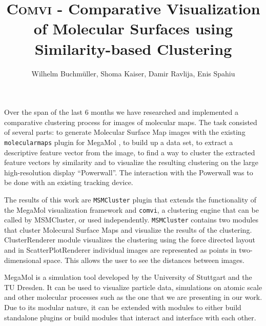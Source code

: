 \documentclass[journal]{vgtc}       %
\title{\textsc{Comvi} - Comparative Visualization of Molecular Surfaces using Similarity-based Clustering}
\author{Wilhelm Buchm\"uller, Shoma Kaiser, Damir Ravlija, Enis Spahiu}
\newcommand{\todo}[1]{\textcolor{red}{\textbf{TODO:} #1}}
\begin{document}

\label{sec:intro}
%
\maketitle
%
Over the span of the last 6 months we  have researched and implemented a comparative clustering  process for images of molecular maps.
The task consisted of several parts: to generate Molecular Surface Map images with the existing \verb|molecularmaps| plugin for MegaMol \cite{MegaMol}, to build up a data set, to extract a descriptive feature vector from the image, to find a way to cluster the extracted  feature vectors by similarity  and to visualize the resulting clustering on the large high-resolution display ``Powerwall''. The interaction with the Powerwall was to be done with  an existing tracking device.

The results of this work are \verb|MSMCluster| plugin that  extends the functionality of the MegaMol visualization framework and \verb|comvi|, a clustering engine that can be called by MSMCluster, or used independently. \verb|MSMCluster| contains two modules that cluster Molecural Surface Maps and visualize the results of the clustering. ClusterRenderer module visualizes the clustering using the force directed layout and in ScatterPlotRenderer individual images are represented as points in two-dimensional space. This allows the user to see the distances between images. 

MegaMol is a simulation tool developed by the University of Stuttgart and the TU Dresden. It can be used to visualize particle data, simulations on atomic scale and other molecular processes such as the one that we are presenting in our work. 
Due to its modular nature, it can be extended with modules to either build standalone plugins or build modules that interact and interface with each other.
\end{document}
